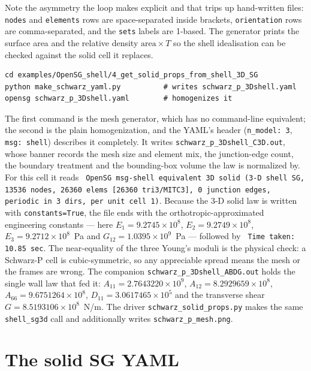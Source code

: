 Note the asymmetry the loop makes explicit and that trips up hand-written files:
\texttt{nodes} and \texttt{elements} rows are space-separated inside brackets,
\texttt{orientation} rows are comma-separated, and the \texttt{sets}
labels are 1-based. The generator prints the surface area and the relative
density $\text{area} \times T$ so the shell idealisation can be checked against
the solid cell it replaces.

\begin{lstlisting}[style=shellst]
cd examples/OpenSG_shell/4_get_solid_props_from_shell_3D_SG
python make_schwarz_yaml.py          # writes schwarz_p_3Dshell.yaml
opensg schwarz_p_3Dshell.yaml        # homogenizes it
\end{lstlisting}

The first command is the mesh generator, which has no command-line
equivalent; the second is the plain homogenization, and the YAML's header
(\texttt{n\_model: 3}, \texttt{msg: shell}) describes it completely. It writes
\texttt{schwarz\_p\_3Dshell\_C3D.out}, whose banner records the mesh size and
element mix, the junction-edge count, the boundary treatment and the
bounding-box volume the law is normalized by. For this cell it reads
\texttt{ OpenSG msg-shell equivalent 3D solid (3-D shell SG, 13536 nodes, 26360
elems [26360 tri3/MITC3], 0 junction edges, periodic in 3 dirs, per unit cell
1)}. Because the 3-D solid law is written with \texttt{constants=True}, the
file ends with the orthotropic-approximated engineering constants --- here
$E_1 = 9.2745\times10^{8}$, $E_2 = 9.2749\times10^{8}$,
$E_3 = 9.2712\times10^{8}$~Pa and $G_{12} = 1.0395\times10^{9}$~Pa --- followed
by \texttt{ Time taken: 10.85 sec}. The near-equality of the three Young's
moduli is the physical check: a Schwarz-P cell is cubic-symmetric, so any
appreciable spread means the mesh or the frames are wrong. The companion
\texttt{schwarz\_p\_3Dshell\_ABDG.out} holds the single wall law that fed it:
$A_{11} = 2.7643220\times10^{9}$, $A_{12} = 8.2929659\times10^{8}$,
$A_{66} = 9.6751264\times10^{8}$, $D_{11} = 3.0617465\times10^{5}$ and the
transverse shear $G = 8.5193106\times10^{8}$~N/m. The driver
\texttt{schwarz\_solid\_props.py} makes the same \texttt{shell\_sg3d} call and
additionally writes \texttt{schwarz\_p\_mesh.png}.

\section{The solid SG YAML}
\label{sec:input-solid}

